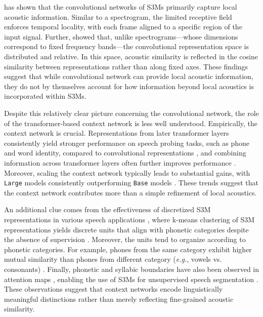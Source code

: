 \documentclass[cameraready]{Interspeech}
\begin{document}



\cite{pasad2021layer} has shown that the convolutional networks of S3Ms primarily capture local acoustic information.
Similar to a spectrogram, the limited receptive field enforces temporal locality, with each frame aligned to a specific region of the input signal.
Further, \cite{choi2022opening} showed that, unlike spectrograms---whose dimensions correspond to fixed frequency bands---the convolutional representation space is distributed and relative.
In this space, acoustic similarity is reflected in the cosine similarity between representations rather than along fixed axes.
These findings suggest that while convolutional network can provide local acoustic information, they do not by themselves account for how information beyond local acoustics is incorporated within S3Ms.


Despite this relatively clear picture concerning the convolutional network, the role of the transformer-based context network is less well understood.
Empirically, the context network is crucial.
Representations from later transformer layers consistently yield stronger performance on speech probing tasks, such as phone and word identity, compared to convolutional representations \cite{pasad2023comparative}, and combining information across transformer layers often further improves performance \cite{shih2024interface}.
Moreover, scaling the context network typically leads to substantial gains, with \texttt{Large} models consistently outperforming \texttt{Base} models \cite{baevski2020wav2vec,hsu2021hubert,chen2022wavlm}.
These trends suggest that the context network contributes more than a simple refinement of local acoustics.


An additional clue comes from the effectiveness of discretized S3M representations in various speech applications \cite{chang2024exploring}, where k-means clustering of S3M representations yields discrete units that align with phonetic categories despite the absence of supervision \cite{wells22_interspeech,baevski2020wav2vec,hsu2021hubert,de2024human}.
Moreover, the units tend to organize according to phonetic categories.
For example, phones from the same category exhibit higher mutual similarity than phones from different category (\textit{e.g.}, vowels vs. consonants) \cite{abdullah2023information,sicherman2023analysing}.
Finally, phonetic and syllabic boundaries have also been observed in attention maps \cite{li2023dissecting}, enabling the use of S3Ms for unsupervised speech segmentation \cite{pasad2024self,baade2025syllablelm,cho2025sylber,cho2026sylber,visser2026zerosyl}.
These observations suggest that context networks encode linguistically meaningful distinctions rather than merely reflecting fine-grained acoustic similarity.
\end{document}
